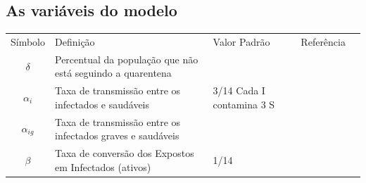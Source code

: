 \documentclass{article}
\begin{document}
\subsection{As variáveis do modelo}

\begin{table}[h]
	\begin{tabular}{|c|p{7cm}|p{2cm}|l|l}
		\cline{1-4}
		Símbolo       & Definição                                                                            & Valor Padrão             & Referência &   \\ \cline{1-4}
		$\delta$       & Percentual da população que não está seguindo a quarentena                         &                           &             &   \\ \cline{1-4}
		$\alpha_i$     & Taxa de transmissão entre os infectados e saudáveis                                  & 3/14 Cada I contamina 3 S &             &   \\ \cline{1-4}
		$\alpha_{ig}$  & Taxa de transmissão entre os infectados graves e saudáveis                           &                           &             &   \\ \cline{1-4}
		$\beta$        & Taxa de conversão dos Expostos em Infectados (ativos)                                 & 1/14                      &             &   \\ \cline{1-4}
														

\end{tabular}
\end{table}
\end{document}
